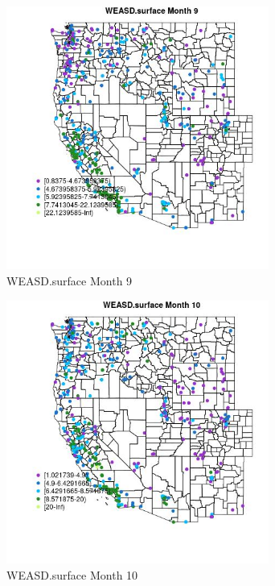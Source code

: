 \begin{figure} 
\centering  
\includegraphics[width=0.77\textwidth]{Code_Outputs/ML_input_report_ML_input_PM25_Step5_part_d_de_duplicated_aves_ML_input_MapObsMo9WEASDsurface.jpg} 
\caption{\label{fig:ML_input_report_ML_input_PM25_Step5_part_d_de_duplicated_aves_ML_inputMapObsMo9WEASDsurface}WEASD.surface Month 9} 
\end{figure} 
 

\clearpage 

\begin{figure} 
\centering  
\includegraphics[width=0.77\textwidth]{Code_Outputs/ML_input_report_ML_input_PM25_Step5_part_d_de_duplicated_aves_ML_input_MapObsMo10WEASDsurface.jpg} 
\caption{\label{fig:ML_input_report_ML_input_PM25_Step5_part_d_de_duplicated_aves_ML_inputMapObsMo10WEASDsurface}WEASD.surface Month 10} 
\end{figure} 
 

